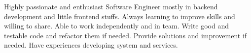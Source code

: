 \begin{cvparagraph}


    Highly passionate and enthusiast Software Engineer mostly in backend development and little frontend stuffs. 
    Always learning to improve skills and willing to share. 
    Able to work independently and in team. 
    Write good and testable code and refactor them if needed.
    Provide solutions and improvement if needed.
    Have experiences developing system and services.
\end{cvparagraph}